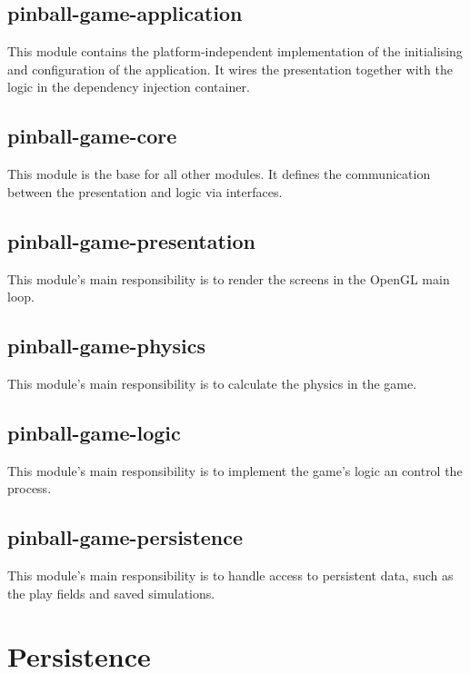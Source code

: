 \documentclass[fontsize=12pt,
               paper=a4,
               twoside=false,
               parskip=half,
               ]{scrartcl}
\begin{document}
\subsection{pinball-game-application}

This module contains the platform-independent implementation of the initialising and configuration of the application. It wires the presentation together with the logic in the dependency injection container.

\subsection{pinball-game-core}

This module is the base for all other modules. It defines the communication between the presentation and logic via interfaces.

\subsection{pinball-game-presentation}

This module's main responsibility is to render the screens in the OpenGL main loop.

\subsection{pinball-game-physics}

This module's main responsibility is to calculate the physics in the game.

\subsection{pinball-game-logic}

This module's main responsibility is to implement the game's logic an control the process.

\subsection{pinball-game-persistence}

This module's main responsibility is to handle access to persistent data, such as the play fields and saved simulations.

\section{Persistence}
\end{document}
